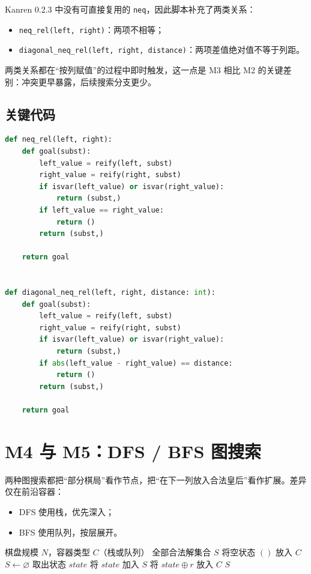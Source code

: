 Kanren 0.2.3 中没有可直接复用的 \texttt{neq}，因此脚本补充了两类关系：
\begin{itemize}
  \item \texttt{neq\_rel(left, right)}：两项不相等；
  \item \texttt{diagonal\_neq\_rel(left, right, distance)}：两项差值绝对值不等于列距。
\end{itemize}

两类关系都在“按列赋值”的过程中即时触发，这一点是 M3 相比 M2 的关键差别：冲突更早暴露，后续搜索分支更少。

\subsection{关键代码}

\begin{lstlisting}[language=Python,caption={自定义不等关系实现},label=lst:custom-neq-rel]
def neq_rel(left, right):
    def goal(subst):
        left_value = reify(left, subst)
        right_value = reify(right, subst)
        if isvar(left_value) or isvar(right_value):
            return (subst,)
        if left_value == right_value:
            return ()
        return (subst,)

    return goal


def diagonal_neq_rel(left, right, distance: int):
    def goal(subst):
        left_value = reify(left, subst)
        right_value = reify(right, subst)
        if isvar(left_value) or isvar(right_value):
            return (subst,)
        if abs(left_value - right_value) == distance:
            return ()
        return (subst,)

    return goal
\end{lstlisting}

\section{M4 与 M5：DFS / BFS 图搜索}

两种图搜索都把“部分棋局”看作节点，把“在下一列放入合法皇后”看作扩展。差异仅在前沿容器：
\begin{itemize}
  \item DFS 使用栈，优先深入；
  \item BFS 使用队列，按层展开。
\end{itemize}

\begin{algorithm}
  \caption{统一搜索框架（DFS/BFS）}\label{algo:search-framework}
  \begin{algorithmic}[1]
    \Require 棋盘规模 $N$，容器类型 $C$（栈或队列）
    \Ensure 全部合法解集合 $S$
    \State 将空状态 $()$ 放入 $C$
    \State $S \gets \varnothing$
    \State 取出状态 $state$
    \State 将 $state$ 加入 $S$
    \Else
    \State 将 $state \oplus r$ 放入 $C$
    \EndIf
    \EndFor
    \EndIf
    \EndWhile
    \State \Return $S$
  \end{algorithmic}
\end{algorithm}

